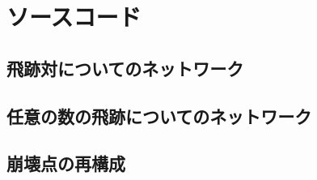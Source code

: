 
\appendix 

\chapter{ソースコード} \label{sec:Code}
\section{飛跡対についてのネットワーク} \label{sec:CodePairModel}
\section{任意の数の飛跡についてのネットワーク} \label{sec:CodeVLSTM}
\section{崩壊点の再構成} \label{sec:CodePairProduction}
